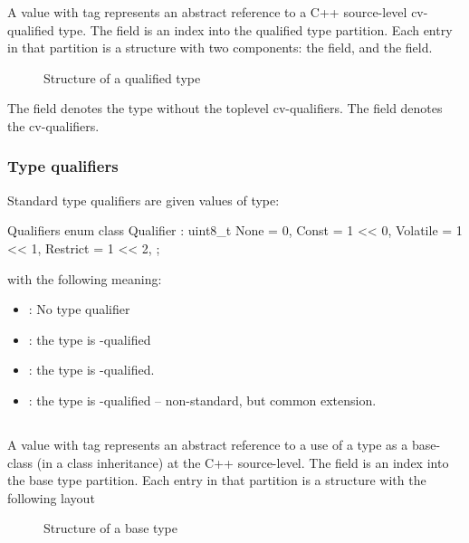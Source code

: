 A  value with tag  represents
an abstract reference to a C++ source-level cv-qualified type.
The  field is an index into the qualified type partition.
Each entry in that partition is a structure with two components: the  field,
and the  field.
%
\begin{figure}[H]
	\centering
	\caption{Structure of a qualified type}
	\label{fig:ifc-qualified-type-structure}
\end{figure}
%
The  field denotes the type without the toplevel cv-qualifiers.
The  field denotes the cv-qualifiers.


\subsubsection{Type qualifiers}
\label{sec:ifc-type-qualifiers}

Standard type qualifiers are given values of type:
\begin{typedef}{Qualifiers}{}
	enum class Qualifier : uint8_t {
		None		= 0,
		Const		= 1 << 0,
		Volatile		= 1 << 1,
		Restrict		= 1 << 2,
	};
\end{typedef}
with the following meaning:
\begin{itemize}
	\item {}: No type qualifier
	\item {}: the type is -qualified
	\item {}: the type is -qualified.
	\item {}: the type is -qualified -- non-standard, but common extension.
\end{itemize}


\subsection{}
\label{sec:ifc:TypeSort:Base}

A  value with tag  represents an
abstract reference to a use of a type as a base-class (in a class inheritance)
at the C++ source-level.
The  field is an index into the base type partition.
Each entry in that partition is a structure with the following layout
%
\begin{figure}[H]
	\centering
	\caption{Structure of a base type}
	\label{fig:ifc-base-type-structure}
\end{figure}
%

